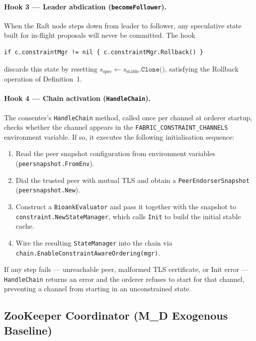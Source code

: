 \paragraph{Hook 3 — Leader abdication (\texttt{becomeFollower}).}
When the Raft node steps down from leader to follower, any speculative state
built for in-flight proposals will never be committed.  The hook
\begin{verbatim}
if c.constraintMgr != nil { c.constraintMgr.Rollback() }
\end{verbatim}
discards this state by resetting $s_\text{spec} \leftarrow
s_\text{stable}.\texttt{Clone()}$, satisfying the Rollback operation of
Definition~1.

\paragraph{Hook 4 — Chain activation (\texttt{HandleChain}).}
The consenter's \texttt{HandleChain} method, called once per channel at orderer
startup, checks whether the channel appears in the \texttt{FABRIC\_CONSTRAINT\_CHANNELS}
environment variable.  If so, it executes the following initialisation
sequence:
\begin{enumerate}
  \item Read the peer snapshot configuration from environment variables
    (\texttt{peersnapshot.FromEnv}).
  \item Dial the trusted peer with mutual TLS and obtain a
    \texttt{PeerEndorserSnapshot} (\texttt{peersnapshot.New}).
  \item Construct a \texttt{BioankEvaluator} and pass it together with the
    snapshot to \texttt{constraint.NewStateManager}, which calls
    \texttt{Init} to build the initial stable cache.
  \item Wire the resulting \texttt{StateManager} into the chain via
    \texttt{chain.EnableConstraintAwareOrdering(mgr)}.
\end{enumerate}
If any step fails — unreachable peer, malformed TLS certificate, or Init
error — \texttt{HandleChain} returns an error and the orderer refuses to start
for that channel, preventing a channel from starting in an unconstrained state.

\subsection{ZooKeeper Coordinator (M_D Exogenous Baseline)}
\label{subsec:impl-zk}


